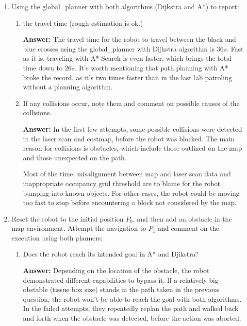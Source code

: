 \documentclass[12pt]{article}
\begin{document}
    \begin{enumerate}
    \item Using the global\_planner with both algorithms (Dijkstra and A*) to report:
    
        \begin{enumerate}
            \item the travel time (rough estimation is ok.)
            
            \textbf{Answer: }The travel time for the robot to travel between the black and blue crosses using the global\_planner with Dijkstra algorithm is $36s$. Fast as it is, traveling with A* Search is even faster, which brings the total time down to $26s$. It's worth mentioning that path planning with A* broke the record, as it's two times faster than in the last lab patroling without a planning algorithm.

            \item If any collisions occur, note them and comment on possible causes of the collisions.
            
            \textbf{Answer: }In the first few attempts, some possible collisions were detected in the laser scan and costmap, before the robot was blocked. The main reason for collisions is obstacles, which include those outlined on the map and those unexpected on the path.

            Most of the time, misalignment between map and laser scan data and inappropriate occupancy grid threshold are to blame for the robot bumping into known objects. For other cases, the robot could be moving too fast to stop before encountering a block not considered by the map.

        \end{enumerate}
    
    \item Reset the robot to the initial position $P_0$, and then add an obstacle in the map environment. Attempt the navigation to $P_1$ and comment on the execution using both planners:
    
    \begin{enumerate}
        \item Does the robot reach its intended goal in A* and Djikstra?
        
        \textbf{Answer: }Depending on the location of the obstacle, the robot demonstrated different capabilities to bypass it. If a relatively big obstable (tissue box size) stands in the path taken in the previous question, the robot won't be able to reach the goal with both algorithms. In the failed attempts, they repeatedly replan the path and walked back and forth when the obstacle was detected, before the action was aborted.


\end{enumerate}
\end{enumerate}
\end{document}

